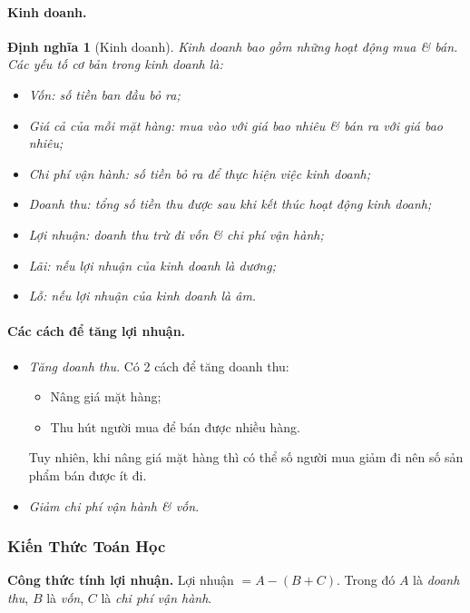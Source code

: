 \documentclass{article}
\numberwithin{equation}{section}
\newtheorem{definition}{Định nghĩa}[section]
\begin{document}
\paragraph{Kinh doanh.}
\begin{definition}[Kinh doanh]
	\emph{Kinh doanh} bao gồm những hoạt động mua \textit{\&} bán. Các yếu tố cơ bản trong kinh doanh là:
	\begin{itemize}
		\item \emph{Vốn:} số tiền ban đầu bỏ ra;
		\item \emph{Giá cả của mỗi mặt hàng:} mua vào với giá bao nhiêu \textit{\&} bán ra với giá bao nhiêu;
		\item \emph{Chi phí vận hành:} số tiền bỏ ra để thực hiện việc kinh doanh;
		\item \emph{Doanh thu:} tổng số tiền thu được sau khi kết thúc hoạt động kinh doanh;
		\item \emph{Lợi nhuận:} doanh thu trừ đi vốn \textit{\&} chi phí vận hành;
		\item \emph{Lãi:} nếu lợi nhuận của kinh doanh là dương;
		\item \emph{Lỗ:} nếu lợi nhuận của kinh doanh là âm.
	\end{itemize}
\end{definition}

\paragraph{Các cách để tăng lợi nhuận.}
\begin{itemize}
	\item \textit{Tăng doanh thu}. Có 2 cách để tăng doanh thu:
	\begin{itemize}
		\item Nâng giá mặt hàng;
		\item Thu hút người mua để bán được nhiều hàng.
	\end{itemize}
	Tuy nhiên, khi nâng giá mặt hàng thì có thể số người mua giảm đi nên số sản phẩm bán được ít đi.
	\item \textit{Giảm chi phí vận hành \textit{\&} vốn}.
\end{itemize}

\subsubsection{Kiến Thức Toán Học}

\begin{tcolorbox}
	\textbf{Công thức tính lợi nhuận.} Lợi nhuận $= A - (B + C)$. Trong đó $A$ là \textit{doanh thu}, $B$ là \textit{vốn}, $C$ là \textit{chi phí vận hành}.
\end{tcolorbox}
\end{document}

